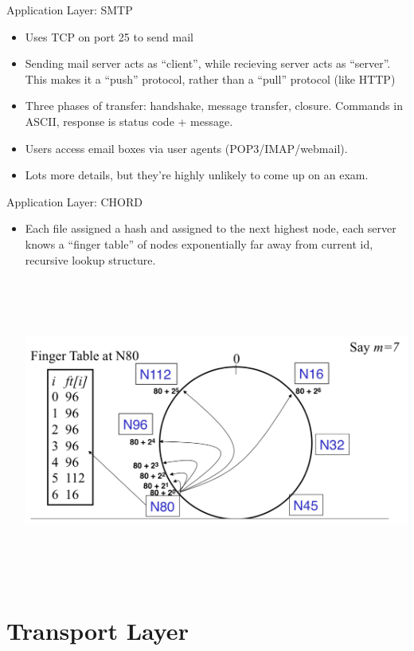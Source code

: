 \documentclass{beamer}
\begin{document}
\begin{frame}[t]{Application Layer: SMTP}
    \begin{itemize}
        \item Uses TCP on port 25 to send mail
        \item Sending mail server acts as ``client'', while recieving server acts as ``server''. This makes it a ``push'' protocol, rather than a ``pull'' protocol (like HTTP)
        \item Three phases of transfer: handshake, message transfer, closure. Commands in ASCII, response is status code + message.
        \item Users access email boxes via \alert{user agents} (POP3/IMAP/webmail).
        \item Lots more details, but they're highly unlikely to come up on an exam.
    \end{itemize}
\end{frame}

\begin{frame}[t]{Application Layer: CHORD}
    \begin{itemize}
        \item Each file assigned a hash and assigned to the next highest node, each server knows a ``finger table'' of nodes exponentially far away from current id, recursive lookup structure.
        
        \includegraphics[height=10cm]{chord.png}
    \end{itemize}
\end{frame}

\section{Transport Layer}
\end{document}
